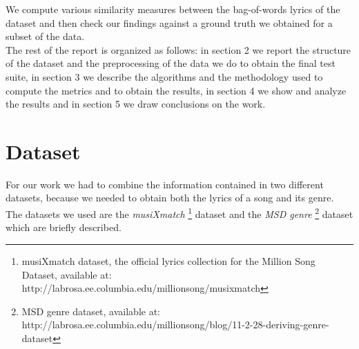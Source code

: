 \documentclass[a4paper, 11pt]{article} %
\begin{document}
We compute various similarity measures between the bag-of-words lyrics of the dataset and then check our findings against a ground truth we obtained for a subset of the data.\\

The rest of the report is organized as follows: in section 2 we report the structure of the dataset and the preprocessing of the data we do to obtain the final test suite, in section 3 we describe the algorithms and the methodology used to compute the metrics and to obtain the results, in section 4 we show and analyze the results and in section 5 we draw conclusions on the work.



\section{Dataset}

For our work we had to combine the information contained in two different datasets, because we needed to obtain both the lyrics of a song and its genre. The datasets we used are the \textit{musiXmatch} \footnote{musiXmatch dataset, the official lyrics collection for the Million Song Dataset, available at: http://labrosa.ee.columbia.edu/millionsong/musixmatch} dataset and the \textit{MSD genre} \footnote{MSD genre dataset, available at: http://labrosa.ee.columbia.edu/millionsong/blog/11-2-28-deriving-genre-dataset} dataset which are briefly described.
\end{document}
